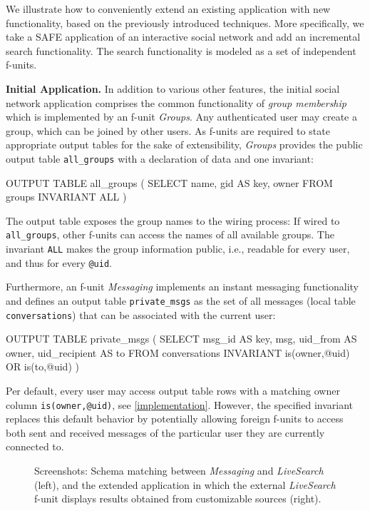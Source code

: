 \documentclass{src/acm_proc_article-sp} \else
\newcommand\myparagraph[1]{\medskip\noindent\textbf{#1.}}
\def \fig #1#2#3#4{\begin{figure}[tp]\centering\epsfig{trim=#2, clip=true, width=#3\textwidth, file=res/#1.eps}\vspace{-3mm}\caption{#4\vspace{-3mm}}\label{#1}\end{figure}}
\newcommand\SAFE{SAFE\xspace}
\begin{document}
We illustrate how to conveniently extend an existing application with
new functionality, based on the previously introduced techniques.
More specifically, we take a \SAFE application of an interactive
social network and add an incremental search functionality. The search
functionality is modeled as a set of independent f-units.


\myparagraph{Initial Application}
In addition to various other features, the initial social network
application comprises the common functionality of \emph{group
membership} which is implemented by an f-unit \emph{Groups}. Any
authenticated user may create a group, which can be joined by other
users.
As f-units are required to state appropriate output tables for the
sake of extensibility, \emph{Groups} provides the public output table
\texttt{all\_groups} with a declaration of data and one invariant:
\begin{lsthere}
    OUTPUT TABLE all_groups (
      SELECT name, gid AS key, owner FROM groups
      INVARIANT ALL )
\end{lsthere}
The output table exposes the group names to the wiring process: If
wired to \texttt{all\_groups}, other f-units can access the names of
all available groups. The invariant \texttt{ALL} makes the group
information public, i.e., readable for every user, and thus for every
\texttt{@uid}.

Furthermore, an f-unit \emph{Messaging} implements an instant
messaging functionality and defines an output table
\texttt{private\_msgs} as the set of all messages (local table
\texttt{conversations}) that can be associated with the current user:
\begin{lsthere}
    OUTPUT TABLE private_msgs (
      SELECT    msg_id AS key,  msg,  uid_from AS owner,  uid_recipient AS to
      FROM      conversations
      INVARIANT is(owner,@uid) OR is(to,@uid) )
\end{lsthere}
Per default, every user may access output table rows with a matching
owner column \texttt{is(owner,@uid)}, see \autoref{implementation}.
However, the specified invariant replaces this default behavior by
potentially allowing foreign f-units to access both sent and received
messages of the particular user they are currently connected to.




\fig{screenshots}{0px 0px 0px 0px}{1}{Screenshots: Schema matching
between \emph{Messaging} and \emph{LiveSearch} (left), and the
extended application in which the external \emph{LiveSearch} f-unit
displays results obtained from customizable sources (right).}
\end{document}
